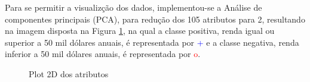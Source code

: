 Para se permitir a visualizção dos dados, implementou-se a Análise de componentes principais (PCA), para redução dos 105 atributos para 2, resultando na imagem disposta na Figura \ref{fig:dados2d}, na qual a classe positiva, renda igual ou superior a 50 mil dólares anuais, é representada por \textcolor{blue}{+} e a classe negativa, renda inferior a 50 mil dólares anuais, é representada por \textcolor{red}{o}.

\begin{figure}[h]
\centering
{}
\caption{Plot 2D dos atributos}
\label{fig:dados2d}
\end{figure}




